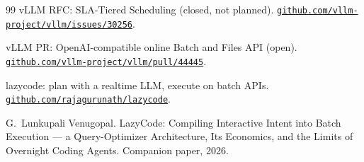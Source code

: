\documentclass[11pt]{article}
\newcommand{\code}[1]{\texttt{#1}}
\begin{document}
\begin{thebibliography}{99}
 vLLM RFC: SLA-Tiered Scheduling (closed, not planned).
\href{https://github.com/vllm-project/vllm/issues/30256}{\code{github.com/vllm-project/vllm/issues/30256}}.

 vLLM PR: OpenAI-compatible online Batch and Files API (open).
\href{https://github.com/vllm-project/vllm/pull/44445}{\code{github.com/vllm-project/vllm/pull/44445}}.

 lazycode: plan with a realtime LLM, execute on batch APIs.
\href{https://github.com/rajagurunath/lazycode}{\code{github.com/rajagurunath/lazycode}}.

 G.~Lunkupali Venugopal. LazyCode: Compiling Interactive Intent
into Batch Execution --- a Query-Optimizer Architecture, Its Economics, and the Limits of
Overnight Coding Agents. Companion paper, 2026.

\end{thebibliography}
\end{document}
